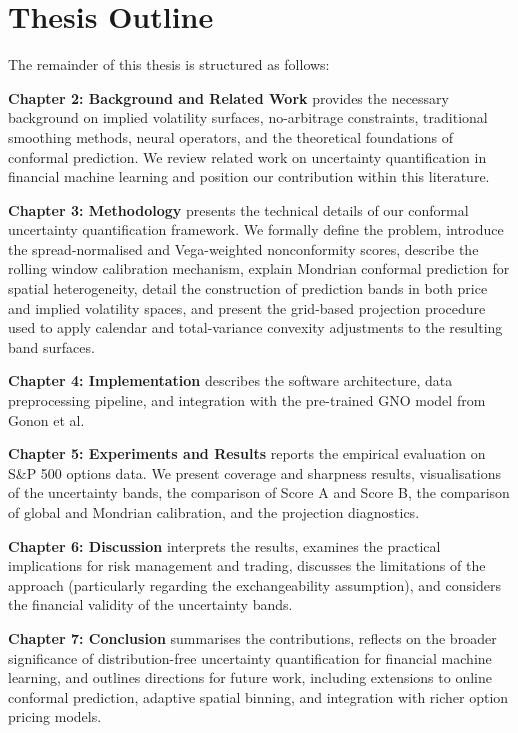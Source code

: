 \section{Thesis Outline}
\label{sec:outline}

The remainder of this thesis is structured as follows:

\textbf{Chapter 2: Background and Related Work} provides the necessary background on implied volatility surfaces, no-arbitrage constraints, traditional smoothing methods, neural operators, and the theoretical foundations of conformal prediction. We review related work on uncertainty quantification in financial machine learning and position our contribution within this literature.

\textbf{Chapter 3: Methodology} presents the technical details of our conformal uncertainty quantification framework. We formally define the problem, introduce the spread-normalised and Vega-weighted nonconformity scores, describe the rolling window calibration mechanism, explain Mondrian conformal prediction for spatial heterogeneity, detail the construction of prediction bands in both price and implied volatility spaces, and present the grid-based projection procedure used to apply calendar and total-variance convexity adjustments to the resulting band surfaces.

\textbf{Chapter 4: Implementation} describes the software architecture, data preprocessing pipeline, and integration with the pre-trained GNO model from Gonon et al.

\textbf{Chapter 5: Experiments and Results} reports the empirical evaluation on S\&P 500 options data. We present coverage and sharpness results, visualisations of the uncertainty bands, the comparison of Score A and Score B, the comparison of global and Mondrian calibration, and the projection diagnostics.

\textbf{Chapter 6: Discussion} interprets the results, examines the practical implications for risk management and trading, discusses the limitations of the approach (particularly regarding the exchangeability assumption), and considers the financial validity of the uncertainty bands.

\textbf{Chapter 7: Conclusion} summarises the contributions, reflects on the broader significance of distribution-free uncertainty quantification for financial machine learning, and outlines directions for future work, including extensions to online conformal prediction, adaptive spatial binning, and integration with richer option pricing models.
